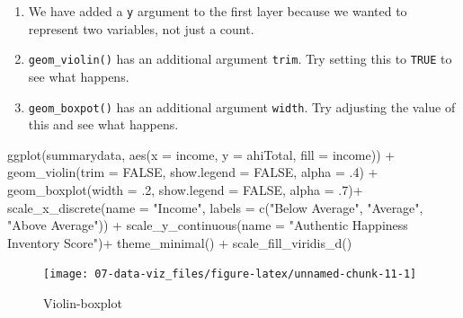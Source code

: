 \documentclass[
  oneside]{book}
\newenvironment{Shaded}{\begin{snugshade}}{\end{snugshade}}
\newcommand{\AttributeTok}[1]{\textcolor[rgb]{0.77,0.63,0.00}{#1}}
\newcommand{\ConstantTok}[1]{\textcolor[rgb]{0.00,0.00,0.00}{#1}}
\newcommand{\DecValTok}[1]{\textcolor[rgb]{0.00,0.00,0.81}{#1}}
\newcommand{\FunctionTok}[1]{\textcolor[rgb]{0.00,0.00,0.00}{#1}}
\newcommand{\NormalTok}[1]{#1}
\newcommand{\SpecialCharTok}[1]{\textcolor[rgb]{0.00,0.00,0.00}{#1}}
\newcommand{\StringTok}[1]{\textcolor[rgb]{0.31,0.60,0.02}{#1}}
\providecommand{\tightlist}{%
  \setlength{\itemsep}{0pt}\setlength{\parskip}{0pt}}
\begin{document}
\begin{enumerate}
\def\labelenumi{\arabic{enumi}.}
\tightlist
\item
  We have added a \texttt{y} argument to the first layer because we wanted to represent two variables, not just a count.
\item
  \texttt{geom\_violin()} has an additional argument \texttt{trim}. Try setting this to \texttt{TRUE} to see what happens.
\item
  \texttt{geom\_boxpot()} has an additional argument \texttt{width}. Try adjusting the value of this and see what happens.
\end{enumerate}

\begin{Shaded}
\begin{Highlighting}[]
\FunctionTok{ggplot}\NormalTok{(summarydata, }\FunctionTok{aes}\NormalTok{(}\AttributeTok{x =}\NormalTok{ income, }\AttributeTok{y =}\NormalTok{ ahiTotal, }\AttributeTok{fill =}\NormalTok{ income)) }\SpecialCharTok{+}
  \FunctionTok{geom\_violin}\NormalTok{(}\AttributeTok{trim =} \ConstantTok{FALSE}\NormalTok{, }\AttributeTok{show.legend =} \ConstantTok{FALSE}\NormalTok{, }\AttributeTok{alpha =}\NormalTok{ .}\DecValTok{4}\NormalTok{) }\SpecialCharTok{+}
  \FunctionTok{geom\_boxplot}\NormalTok{(}\AttributeTok{width =}\NormalTok{ .}\DecValTok{2}\NormalTok{, }\AttributeTok{show.legend =} \ConstantTok{FALSE}\NormalTok{, }\AttributeTok{alpha =}\NormalTok{ .}\DecValTok{7}\NormalTok{)}\SpecialCharTok{+}
  \FunctionTok{scale\_x\_discrete}\NormalTok{(}\AttributeTok{name =} \StringTok{"Income"}\NormalTok{,}
                   \AttributeTok{labels =} \FunctionTok{c}\NormalTok{(}\StringTok{"Below Average"}\NormalTok{, }\StringTok{"Average"}\NormalTok{, }\StringTok{"Above Average"}\NormalTok{)) }\SpecialCharTok{+}
  \FunctionTok{scale\_y\_continuous}\NormalTok{(}\AttributeTok{name =} \StringTok{"Authentic Happiness Inventory Score"}\NormalTok{)}\SpecialCharTok{+}
  \FunctionTok{theme\_minimal}\NormalTok{() }\SpecialCharTok{+}
  \FunctionTok{scale\_fill\_viridis\_d}\NormalTok{()}
\end{Highlighting}
\end{Shaded}

\begin{figure}

{\centering \texttt{[image: 07-data-viz\_files/figure-latex/unnamed-chunk-11-1]} 

}

\caption{Violin-boxplot}\label{fig:unnamed-chunk-11}
\end{figure}
\end{document}
